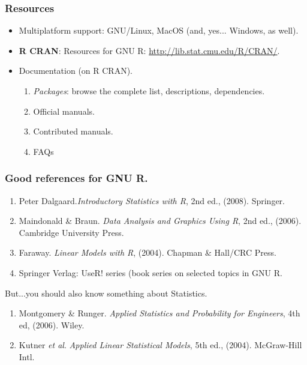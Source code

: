 \documentclass{beamer}
\begin{document}

\begin{frame}

\frametitle{Resources}
 \begin{itemize}
  \item Multiplatform support: GNU/Linux, MacOS (and, yes... Windows, as well).
  \item \textbf{R CRAN}: Resources for GNU R:
  \url{http://lib.stat.cmu.edu/R/CRAN/}. 
  \item Documentation (on R CRAN).
  \begin{enumerate}
   \item \textit{Packages}: browse the 
   complete list, descriptions, dependencies.
   \item Official manuals.
   \item Contributed manuals.
   \item FAQs
  \end{enumerate}
 \end{itemize}

\end{frame}


\begin{frame}

 \frametitle{Good references for GNU R.}
 \begin{enumerate}
  \item Peter Dalgaard.\textit{Introductory Statistics with R}, 2nd ed., (2008). Springer.
  \item Maindonald \& Braun. \textit{Data Analysis and Graphics Using R}, 2nd ed., (2006).
  Cambridge University Press.
  \item Faraway. \textit{Linear Models with R}, (2004). Chapman \& Hall/CRC Press.
  \item Springer Verlag: UseR! series (book series on selected topics in GNU R.
 \end{enumerate}
 But...you should also know something about Statistics.
 \begin{enumerate}
  \item Montgomery \& Runger. \textit{Applied Statistics and Probability for Engineers},
  4th ed, (2006). Wiley.
  \item Kutner \emph{et al}. \textit{Applied Linear Statistical Models}, 5th ed., (2004).
  McGraw-Hill Intl.
 \end{enumerate}

\end{frame}
\end{document}

